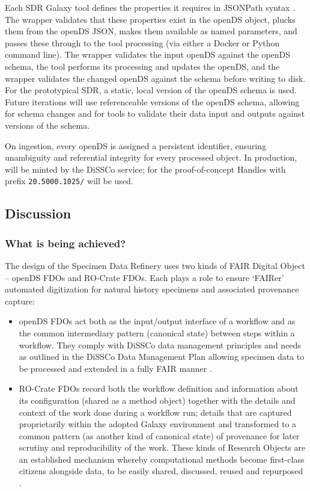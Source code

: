 Each SDR Galaxy tool defines the properties it requires in JSONPath
syntax \cite{JSONPath 2023}. The wrapper validates that these properties exist in
the openDS object, plucks them from the openDS JSON, makes them
available as named parameters, and passes these through to the tool
processing (via either a Docker or Python command line). The wrapper
validates the input openDS against the openDS schema, the tool performs
its processing and updates the openDS, and the wrapper validates the
changed openDS against the schema before writing to disk. For the
prototypical SDR, a static, local version of the openDS schema is used.
Future iterations will use referenceable versions of the openDS schema,
allowing for schema changes and for tools to validate their data input
and outputs against versions of the schema.

On ingestion, every openDS is assigned a persistent identifier, ensuring
unambiguity and referential integrity for every processed object. In
production,  
will be minted by the \acrshort{DiSSCo} service; for the
proof-of-concept \glspl{Handle} with prefix \texttt{20.5000.1025/} will be
used.

\subsection{Discussion}\label{ch8:discussion}

\subsubsection{What is being achieved?}\label{ch8:what-is-being-achieved}

The design of the Specimen Data Refinery uses two kinds of FAIR Digital
Object -- openDS FDOs and RO-Crate FDOs. Each plays a role to ensure
`FAIRer' automated digitization for natural history specimens and
associated provenance capture:

\begin{itemize}
\item
  openDS FDOs act both as the input/output interface of a workflow and
  as the common intermediary pattern (canonical state) between steps
  within a workflow. They comply with DiSSCo data management principles
  and needs as outlined in the DiSSCo Data Management Plan \cite{Hardisty 2019b}
  allowing specimen data to be processed and extended in a fully FAIR
  manner \cite{Lannom 2020}.
\item
  RO-Crate FDOs record both the workflow definition and information
  about its configuration (shared as a method object) together with the
  details and context of the work done during a workflow run; details
  that are captured proprietarily within the adopted Galaxy environment
  and transformed to a common pattern (as another kind of canonical
  state) of provenance for later scrutiny and reproducibility of the
  work. These kinds of Research Objects \cite{Bechhofer 2013} are an established
  mechanism whereby computational methods become first-class citizens
  alongside data, to be easily shared, discussed, reused and repurposed
  \cite{De Roure 2010}.
\end{itemize}

